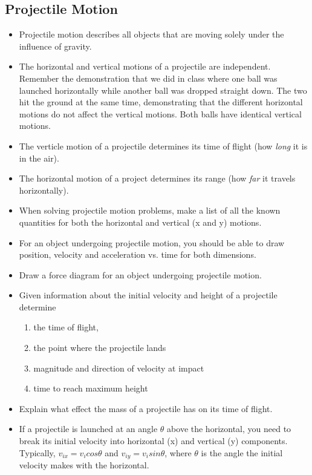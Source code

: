 \subsection{Projectile Motion}
\begin{itemize}
\item Projectile motion describes all objects that are moving solely
  under the influence of gravity.  
\item The horizontal and vertical motions of a projectile are
  independent.  Remember the demonstration that we did in class where
  one ball was launched horizontally while another ball was dropped
  straight down.  The two hit the ground at the same time,
  demonstrating that the different horizontal motions do not affect
  the vertical motions.  Both balls have identical vertical motions.
\item The verticle motion of a projectile determines its time of flight
  (how {\em long} it is in the air).
\item The horizontal motion of a project determines its range (how {\em far}
  it travels horizontally).
\item When solving projectile motion problems, make a list of all the
  known quantities for both the horizontal and vertical (x and y)
  motions.

\item For an object undergoing projectile motion, you should be able
  to draw position, velocity and acceleration vs. time for both dimensions. 
\item Draw a force diagram for an object undergoing projectile motion. 
\item Given information about the initial velocity and height of a projectile determine 
\begin{enumerate}
\item the time of flight, 
\item the point where the projectile lands 
\item magnitude and direction of velocity at impact 
\item time to reach maximum height
\end{enumerate}
\item Explain what effect the mass of a projectile has on its time of
  flight.
\item If a projectile is launched at an angle $\theta$ above the
  horizontal, you need to break its initial velocity into horizontal
  (x) and vertical (y) components.  Typically, $v_{ix} = v_i cos\theta$
  and $v_{iy} = v_i sin\theta$, where $\theta$ is the angle the
  initial velocity makes with the horizontal.

\end{itemize}


